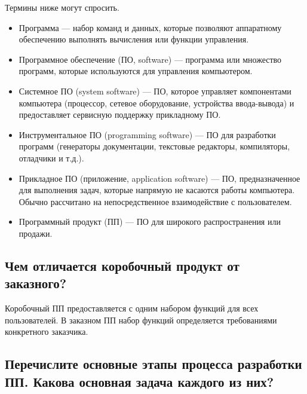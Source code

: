Термины ниже могут спросить.

\begin{itemize}
    \item Программа --- набор команд и данных, которые позволяют аппаратному
        обеспечению выполнять вычисления или функции управления.

    \item Программное обеспечение (ПО, software) --- программа или множество
        программ, которые используются для управления компьютером.

    \item Системное ПО (system software) --- ПО, которое управляет компонентами
        компьютера (процессор, сетевое оборудование, устройства ввода-вывода) и
        предоставляет сервисную поддержку прикладному ПО.

    \item Инструментальное ПО (programming software) --- ПО для разработки
        программ (генераторы документации, текстовые редакторы, компиляторы,
        отладчики и т.д.).

    \item Прикладное ПО (приложение, application software) --- ПО,
        предназначенное для выполнения задач, которые напрямую не касаются работы
        компьютера. Обычно рассчитано на непосредственное взаимодействие с
        пользователем.

    \item Программный продукт (ПП) --- ПО для широкого распространения или
        продажи.
\end{itemize}

\subsection{Чем отличается коробочный продукт от заказного?}

Коробочный ПП предоставляется с одним набором функций для всех пользователей. 
В заказном ПП набор функций определяется требованиями конкретного заказчика.

\subsection{Перечислите основные этапы процесса разработки ПП. Какова основная
задача каждого из них?}

